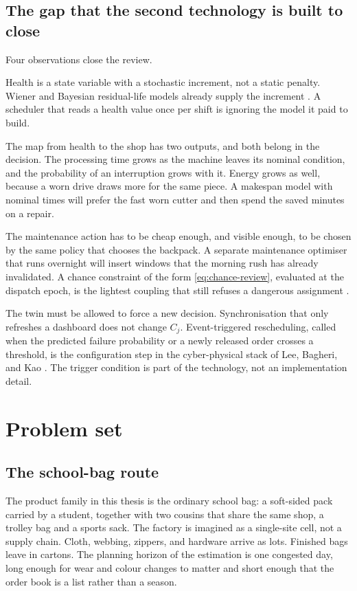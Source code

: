 \subsection{The gap that the second technology is built to close}

Four observations close the review.

Health is a state variable with a stochastic increment, not a static penalty. Wiener and Bayesian residual-life models already supply the increment \cite{si2011,si2012,gebraeel2005}. A scheduler that reads a health value once per shift is ignoring the model it paid to build.

The map from health to the shop has two outputs, and both belong in the decision. The processing time grows as the machine leaves its nominal condition, and the probability of an interruption grows with it. Energy grows as well, because a worn drive draws more for the same piece. A makespan model with nominal times will prefer the fast worn cutter and then spend the saved minutes on a repair.

The maintenance action has to be cheap enough, and visible enough, to be chosen by the same policy that chooses the backpack. A separate maintenance optimiser that runs overnight will insert windows that the morning rush has already invalidated. A chance constraint of the form \eqref{eq:chance-review}, evaluated at the dispatch epoch, is the lightest coupling that still refuses a dangerous assignment \cite{charnes1959}.

The twin must be allowed to force a new decision. Synchronisation that only refreshes a dashboard does not change \(C_j\). Event-triggered rescheduling, called when the predicted failure probability or a newly released order crosses a threshold, is the configuration step in the cyber-physical stack of Lee, Bagheri, and Kao \cite{lee2015}. The trigger condition is part of the technology, not an implementation detail.

\section{Problem set}
\label{sec:problem-set}

\subsection{The school-bag route}

The product family in this thesis is the ordinary school bag: a soft-sided pack carried by a student, together with two cousins that share the same shop, a trolley bag and a sports sack. The factory is imagined as a single-site cell, not a supply chain. Cloth, webbing, zippers, and hardware arrive as lots. Finished bags leave in cartons. The planning horizon of the estimation is one congested day, long enough for wear and colour changes to matter and short enough that the order book is a list rather than a season.

